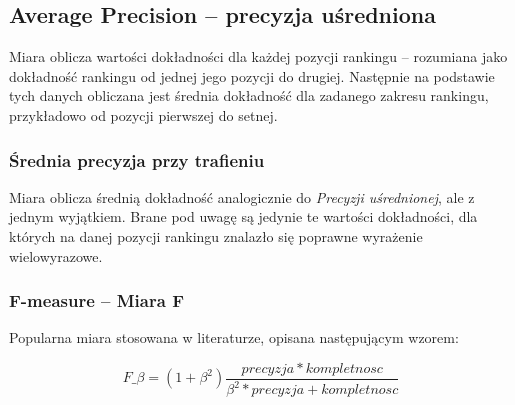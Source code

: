 \subsection{Average Precision -- precyzja uśredniona}
Miara oblicza wartości dokładności dla każdej pozycji rankingu -- rozumiana jako dokładność rankingu od jednej jego pozycji do drugiej.
Następnie na podstawie tych danych obliczana jest średnia dokładność dla zadanego zakresu rankingu, przykładowo od pozycji pierwszej do setnej.

\subsubsection{Średnia precyzja przy trafieniu}
Miara oblicza średnią dokładność analogicznie do \emph{Precyzji uśrednionej}, ale z jednym wyjątkiem.
Brane pod uwagę są jedynie te wartości dokładności, dla których na danej pozycji rankingu znalazło się poprawne wyrażenie wielowyrazowe.

\subsubsection{F-measure -- Miara F}
Popularna miara stosowana w literaturze, opisana następującym wzorem:

$$ F\_{\beta} = (1 + \beta^{2})\frac{precyzja * kompletnosc}{\beta^{2} * precyzja + kompletnosc} $$